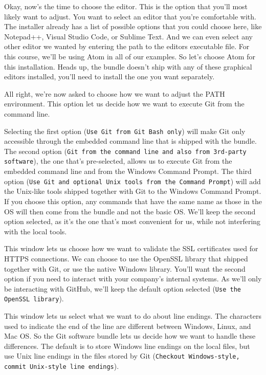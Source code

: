 	Okay, now's the time to choose the editor. This is the option that you'll most likely want to adjust. You want to select an editor that you're comfortable with. The installer already has a list of possible options that you could choose here, like Notepad++, Visual Studio Code, or Sublime Text. And we can even select any other editor we wanted by entering the path to the editors executable file. For this course, we'll be using Atom in all of our examples. So let's choose Atom for this installation. Heads up, the bundle doesn't ship with any of these graphical editors installed, you'll need to install the one you want separately.
	
	All right, we're now asked to choose how we want to adjust the PATH environment. This option let us decide how we want to execute Git from the command line.
	
	Selecting the first option (\texttt{Use Git from Git Bash only}) will make Git only accessible through the embedded command line that is shipped with the bundle. The second option (\texttt{Git from the command line and also from 3rd-party software}), the one that's pre-selected, allows us to execute Git from the embedded command line and from the Windows Command Prompt. The third option (\texttt{Use Git and optional Unix tools from the Command Prompt}) will add the Unix-like tools shipped together with Git to the Windows Command Prompt. If you choose this option, any commands that have the same name as those in the OS will then come from the bundle and not the basic OS. We'll keep the second option selected, as it's the one that's most convenient for us, while not interfering with the local tools.
	
	This window lets us choose how we want to validate the SSL certificates used for HTTPS connections. We can choose to use the OpenSSL library that shipped together with Git, or use the native Windows library. You'll want the second option if you need to interact with your company's internal systems. As we'll only be interacting with GitHub, we'll keep the default option selected (\texttt{Use the OpenSSL library}).
	
	This window lets us select what we want to do about line endings. The characters used to indicate the end of the line are different between Windows, Linux, and Mac OS. 
	So the Git software bundle lets us decide how we want to handle these differences. The default is to store Windows line endings on the local files, but use Unix line endings in the files stored by Git (\texttt{Checkout Windows-style, commit Unix-style line endings}).
	
